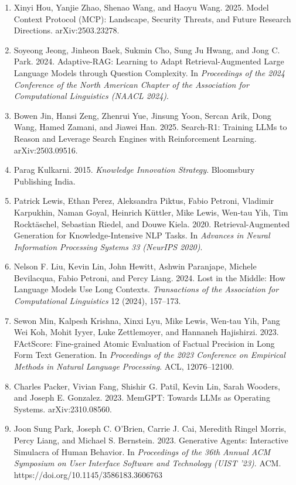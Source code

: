 \documentclass[oneside,a4paper,12pt]{report}
\begin{document}
\begin{appendices}
\begin{enumerate}
\item Xinyi Hou, Yanjie Zhao, Shenao Wang, and Haoyu Wang. 2025. Model Context Protocol (MCP): Landscape, Security Threats, and Future Research Directions. arXiv:2503.23278.
\item Soyeong Jeong, Jinheon Baek, Sukmin Cho, Sung Ju Hwang, and Jong C. Park. 2024. Adaptive-RAG: Learning to Adapt Retrieval-Augmented Large Language Models through Question Complexity. In \textit{Proceedings of the 2024 Conference of the North American Chapter of the Association for Computational Linguistics (NAACL 2024)}.
\item Bowen Jin, Hansi Zeng, Zhenrui Yue, Jinsung Yoon, Sercan Arik, Dong Wang, Hamed Zamani, and Jiawei Han. 2025. Search-R1: Training LLMs to Reason and Leverage Search Engines with Reinforcement Learning. arXiv:2503.09516.
\item Parag Kulkarni. 2015. \textit{Knowledge Innovation Strategy}. Bloomsbury Publishing India.
\item Patrick Lewis, Ethan Perez, Aleksandra Piktus, Fabio Petroni, Vladimir Karpukhin, Naman Goyal, Heinrich K\"{u}ttler, Mike Lewis, Wen-tau Yih, Tim Rockt\"{a}schel, Sebastian Riedel, and Douwe Kiela. 2020. Retrieval-Augmented Generation for Knowledge-Intensive NLP Tasks. In \textit{Advances in Neural Information Processing Systems 33 (NeurIPS 2020)}.
\item Nelson F. Liu, Kevin Lin, John Hewitt, Ashwin Paranjape, Michele Bevilacqua, Fabio Petroni, and Percy Liang. 2024. Lost in the Middle: How Language Models Use Long Contexts. \textit{Transactions of the Association for Computational Linguistics} 12 (2024), 157--173.
\item Sewon Min, Kalpesh Krishna, Xinxi Lyu, Mike Lewis, Wen-tau Yih, Pang Wei Koh, Mohit Iyyer, Luke Zettlemoyer, and Hannaneh Hajishirzi. 2023. FActScore: Fine-grained Atomic Evaluation of Factual Precision in Long Form Text Generation. In \textit{Proceedings of the 2023 Conference on Empirical Methods in Natural Language Processing}. ACL, 12076--12100.
\item Charles Packer, Vivian Fang, Shishir G. Patil, Kevin Lin, Sarah Wooders, and Joseph E. Gonzalez. 2023. MemGPT: Towards LLMs as Operating Systems. arXiv:2310.08560.
\item Joon Sung Park, Joseph C. O'Brien, Carrie J. Cai, Meredith Ringel Morris, Percy Liang, and Michael S. Bernstein. 2023. Generative Agents: Interactive Simulacra of Human Behavior. In \textit{Proceedings of the 36th Annual ACM Symposium on User Interface Software and Technology (UIST '23)}. ACM. https://doi.org/10.1145/3586183.3606763

\end{enumerate}
\end{appendices}
\end{document}
